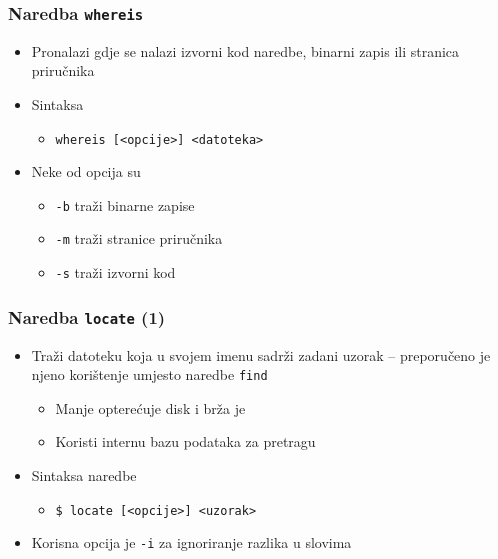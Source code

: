\documentclass{beamer}
\newcommand{\shell}[1]{\texttt{#1}}
\begin{document}
\begin{frame}[t]
\frametitle{Naredba \shell{whereis}}
\begin{itemize}
  \item Pronalazi gdje se nalazi izvorni kod naredbe, binarni zapis ili 
        stranica priručnika
  \item Sintaksa
  \begin{itemize}
    \item \shell{whereis [<opcije>] <datoteka>}
  \end{itemize}
  \item Neke od opcija su
  \begin{itemize}
    \item[] \shell{-b} traži binarne zapise
    \item[] \shell{-m} traži stranice priručnika
    \item[] \shell{-s} traži izvorni kod
  \end{itemize}
\end{itemize}
\end{frame}

\begin{frame}[t]
\frametitle{Naredba \shell{locate} (1)}
\begin{itemize}
  \item Traži datoteku koja u svojem imenu sadrži zadani uzorak -- 
        preporučeno je njeno korištenje umjesto naredbe \shell{find}
  \begin{itemize}
    \item Manje opterećuje disk i brža je
    \item Koristi internu bazu podataka za pretragu
  \end{itemize}
  \item Sintaksa naredbe
  \begin{itemize}
    \item[] \shell{\$ locate [<opcije>] <uzorak>}
  \end{itemize}
  \item Korisna opcija je \shell{-i} za ignoriranje razlika u slovima
\end{itemize}
\end{frame}
\end{document}
